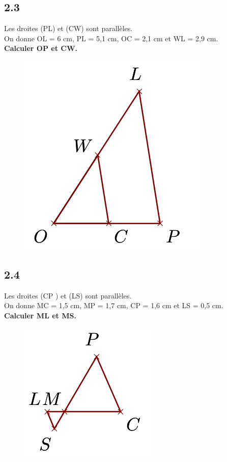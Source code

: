\documentclass[12pt]{article}
\begin{document}
\begin{multicols}{2}
  \subsection*{2.3}
  \begin{multicols}{2}
    Les droites (PL) et (CW) sont parallèles.\\
    On donne OL = 6 cm, PL = 5,1 cm, OC = 2,1 cm et WL = 2,9 cm.\\
    \textbf{Calculer OP et CW.}
    \begin{figure}[H]
      \centering
      \includegraphics[width=.5\linewidth]{4x6-thales/sources/th3.png}
    \end{figure}
  \end{multicols}


  \subsection*{2.4}
  \begin{multicols}{2}
    Les droites (CP ) et (LS) sont parallèles.\\
    On donne MC = 1,5 cm, MP = 1,7 cm, CP = 1,6 cm et LS = 0,5 cm.\\
    \textbf{Calculer ML et MS.}
    \begin{figure}[H]
      \centering
      \includegraphics[width=.5\linewidth]{4x6-thales/sources/th4.png}
    \end{figure}
  \end{multicols}
\end{multicols}
\end{document}
